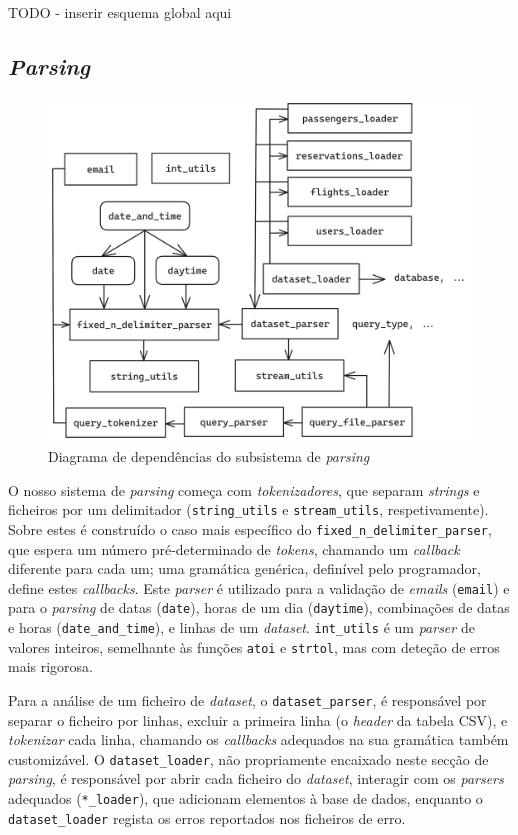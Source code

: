 \documentclass[12pt, a4paper]{article}
\begin{document}
\newpage
TODO - inserir esquema global aqui
\newpage

\subsection{\emph{Parsing}}
\label{sec:parsing}

\begin{figure}[h]
    \centering
    \includegraphics[scale=0.17]{res/parsing.png}
    \caption{Diagrama de dependências do subsistema de \emph{parsing}}
    \label{fig:parsing}
\end{figure}

O nosso sistema de \emph{parsing} começa com \emph{tokenizadores}, que separam \emph{strings} e
ficheiros por um delimitador (\texttt{string\_utils} e \texttt{stream\_utils}, respetivamente).
Sobre estes é construído o caso mais específico do \texttt{fixed\_n\_delimiter\_parser}, que espera
um número pré-determinado de \emph{tokens}, chamando um \emph{callback} diferente para cada um; uma
gramática genérica, definível pelo programador, define estes \emph{callbacks}. Este \emph{parser}
é utilizado para a validação de \emph{emails} (\texttt{email}) e para o \emph{parsing} de datas
(\texttt{date}), horas de um dia (\texttt{daytime}), combinações de datas e horas
(\texttt{date\_and\_time}), e linhas de um \emph{dataset}. \texttt{int\_utils} é um \emph{parser}
de valores inteiros, semelhante às funções \texttt{atoi} e \texttt{strtol}, mas com deteção de erros
mais rigorosa.

Para a análise de um ficheiro de \emph{dataset}, o \texttt{dataset\_parser}, é responsável por
separar o ficheiro por linhas, excluir a primeira linha (o \emph{header} da tabela CSV), e
\emph{tokenizar} cada linha, chamando os \emph{callbacks} adequados na sua gramática também
customizável. O \texttt{dataset\_loader}, não propriamente encaixado neste secção de
\emph{parsing}, é responsável por abrir cada ficheiro do \emph{dataset}, interagir com os
\emph{parsers} adequados (\texttt{*\_loader}), que adicionam elementos à base de dados, enquanto
o \texttt{dataset\_loader} regista os erros reportados nos ficheiros de erro.
\end{document}

